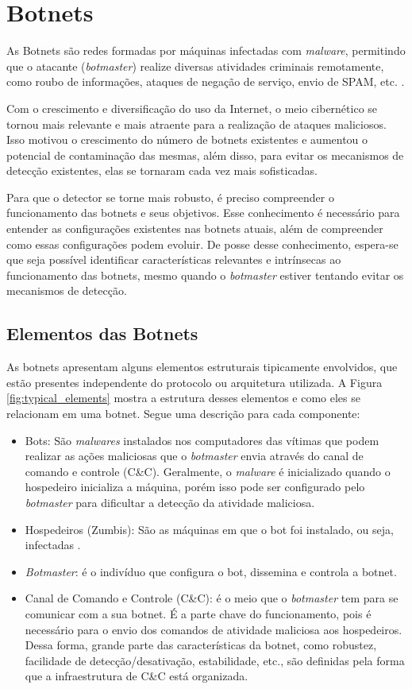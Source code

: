 \chapter{Botnets}
As Botnets são redes formadas por máquinas infectadas com \textit{malware}, permitindo que o atacante (\textit{botmaster}) realize diversas atividades criminais remotamente, como roubo de informações, ataques de negação de serviço, envio de SPAM, etc. \citep{silva2013botnets}.

Com o crescimento e diversificação do uso da Internet, o meio cibernético se tornou mais relevante e mais atraente para a realização de ataques maliciosos. Isso motivou o crescimento do número de botnets existentes e aumentou o potencial de contaminação das mesmas, além disso, para evitar os mecanismos de detecção existentes, elas se tornaram cada vez mais sofisticadas.

Para que o detector se torne mais robusto, é preciso compreender o funcionamento das botnets e seus objetivos. Esse conhecimento é necessário para entender as configurações existentes nas botnets atuais, além de compreender como essas configurações podem evoluir. De posse desse conhecimento, espera-se que seja possível identificar características relevantes e intrínsecas ao funcionamento das botnets, mesmo quando o \textit{botmaster} estiver tentando evitar os mecanismos de detecção.

\section{Elementos das Botnets}
As botnets apresentam alguns elementos estruturais tipicamente envolvidos, que estão presentes independente do protocolo ou arquitetura utilizada. A Figura \ref{fig:typical_elements} mostra a estrutura desses elementos e como eles se relacionam em uma botnet. Segue uma descrição para cada componente:
\begin{itemize}  
\item Bots: São \textit{malwares} instalados nos computadores das vítimas que podem realizar as ações maliciosas que o \textit{botmaster} envia através do canal de comando e controle (C\&C). Geralmente, o \textit{malware} é inicializado quando o hospedeiro inicializa a máquina, porém isso pode ser configurado pelo \textit{botmaster} para dificultar a detecção da atividade maliciosa.
\item Hospedeiros (Zumbis): São as máquinas em que o bot foi instalado, ou seja, infectadas \citep{puri2003bots}.
\item \textit{Botmaster}: é o indivíduo que configura o bot, dissemina e controla a botnet.
\item Canal de Comando e Controle (C\&C): é o meio que o \textit{botmaster} tem para se comunicar com a sua botnet. É a parte chave do funcionamento, pois é necessário para o envio dos comandos de atividade maliciosa aos hospedeiros. Dessa forma, grande parte das características da botnet, como robustez, facilidade de detecção/desativação, estabilidade, etc., são definidas pela forma que a infraestrutura de C\&C está organizada.
\end{itemize}

